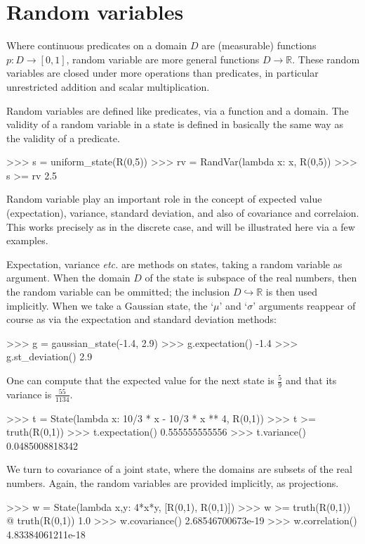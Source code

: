 \documentclass[leqno]{tufte-book} %
\newcommand{\etc}{\textit{etc.}\xspace} %
\newcommand{\RN}{\mathbb{R}}     %
\begin{document}
\section{Random variables}\label{sec:crandvar}

Where continuous predicates on a domain $D$ are (measurable) functions
$p\colon D \rightarrow [0,1]$, random variable are more general
functions $D \rightarrow \RN$. These random variables are closed under
more operations than predicates, in particular unrestricted addition
and scalar multiplication.

Random variables are defined like predicates, via a function and
a domain. The validity of a random variable in a state is defined
in basically the same way as the validity of a predicate.
\begin{python}
>>> s = uniform_state(R(0,5))
>>> rv = RandVar(lambda x: x, R(0,5))
>>> s >= rv
2.5
\end{python}

Random variable play an important role in the concept of expected
value (expectation), variance, standard deviation, and also of
covariance and correlaion. This works precisely as in the discrete
case, and will be illustrated here via a few examples.

Expectation, variance \etc are methods on states, taking a random
variable as argument. When the domain $D$ of the state is subspace of
the real numbers, then the random variable can be ommitted; the
inclusion $D \hookrightarrow \RN$ is then used implicitly.  When we
take a Gaussian state, the `$\mu$' and `$\sigma$' arguments reappear
of course as via the expectation and standard deviation methods:
\begin{python}
>>> g = gaussian_state(-1.4, 2.9)
>>> g.expectation()
-1.4
>>> g.st_deviation()
2.9
\end{python}


One can compute that the expected value for the next state
is $\frac{5}{9}$ and that its variance is $\frac{55}{1134}$.
\begin{python}
>>> t = State(lambda x: 10/3 * x - 10/3 * x ** 4, R(0,1))
>>> t >= truth(R(0,1))
>>> t.expectation()
0.555555555556
>>> t.variance()
0.0485008818342
\end{python}

We turn to covariance of a joint state, where the domains are
subsets of the real numbers. Again, the random variables are
provided implicitly, as projections.
\begin{python}
>>> w = State(lambda x,y: 4*x*y, [R(0,1), R(0,1)])
>>> w >= truth(R(0,1)) @ truth(R(0,1))
1.0
>>> w.covariance()
2.68546700673e-19
>>> w.correlation()
4.83384061211e-18
\end{python}
\end{document}
